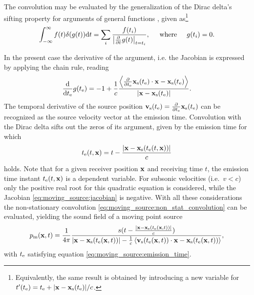 The convolution may be evaluated by the generalization of the Dirac delta's sifting property for arguments of general functions \cite{Dowling1983, Crighton1992, Jackson1999}, given as\footnote{
Equivalently, the same result is obtained by introducing a new variable for $t'(t_{\mathrm{e}}) = t_{\mathrm{e}} + |\mathbf{x}-\mathbf{x}_{\mathrm{s}}(t_{\mathrm{e}})|/c$.}
\begin{equation}
\int_{-\infty}^{\infty} f(t) \delta(g(t)) \mathrm{d} t = \sum_{i} \frac{f(t_i)}{\left| \frac{\partial}{\partial t} g(t) \right|_{t = t_i}}, \hspace{5mm} \text{where} \hspace{5mm} g(t_i) = 0.
\end{equation}

In the present case the derivative of the argument, i.e. the Jacobian is expressed by applying the chain rule, reading 
\begin{equation}
\label{eq:moving_source:jacobian}
\frac{\mathrm{d} }{\mathrm{d} t_{\mathrm{e}}} g(t_{\mathrm{e}}) = - 1 + \frac{1}{c} \frac{\left< \frac{\partial}{\partial t_{\mathrm{e}}} \mathbf{x}_{\mathrm{s}}(t_{\mathrm{e}}) \cdot \mathbf{x}-\mathbf{x}_{\mathrm{s}}(t_{\mathrm{e}})\right> }{|\mathbf{x}-\mathbf{x}_{\mathrm{s}}(t_{\mathrm{e}})|}.
\end{equation}
The temporal derivative of the source position $\mathbf{v}_{\mathrm{s}}(t_{\mathrm{e}}) = \frac{\partial}{\partial t_{\mathrm{e}}}\mathbf{x}_{\mathrm{s}}(t_{\mathrm{e}})$ can be recognized as the source velocity vector at the emission time.
Convolution with the Dirac delta sifts out the zeros of its argument, given by the emission time for which
\begin{equation}
\label{eq:moving_source:emission_time}
t_{\mathrm{e}}(t,\mathbf{x}) = t - \frac{|\mathbf{x}-\mathbf{x}_{\mathrm{s}}(t_{\mathrm{e}}(t,\mathbf{x}))|}{c}
\end{equation}
holds.
Note that for a given receiver position $\mathbf{x}$ and receiving time $t$, the emission time instant $t_{\mathrm{e}}(t,\mathbf{x})$ is a dependent variable.
For subsonic velocities (i.e.\ $v<c$) only the positive real root for this quadratic equation is considered, while the Jacobian \eqref{eq:moving_source:jacobian} is negative.
With all these considerations the non-stationary convolution \eqref{eq:moving_source:non_stat_convolution} can be evaluated, yielding the sound field of a moving point source
\begin{equation}
p_{\mathrm{m}}(\mathbf{x},t) =
\frac{1}{4\pi} \frac{ s(t - \frac{|\mathbf{x}-\mathbf{x}_{\mathrm{s}}(t_{\mathrm{e}}(\mathbf{x},t))|}{c} ) }{|\mathbf{x}-\mathbf{x}_{\mathrm{s}}(t_{\mathrm{e}}(\mathbf{x},t))| - \frac{1}{c}\left< \mathbf{v}_{\mathrm{s}}(t_{\mathrm{e}}(\mathbf{x},t)) \cdot \mathbf{x}-\mathbf{x}_{\mathrm{s}}(t_{\mathrm{e}}(\mathbf{x},t))\right> },
\end{equation}
with $t_{\mathrm{e}}$ satisfying equation \eqref{eq:moving_source:emission_time}.


